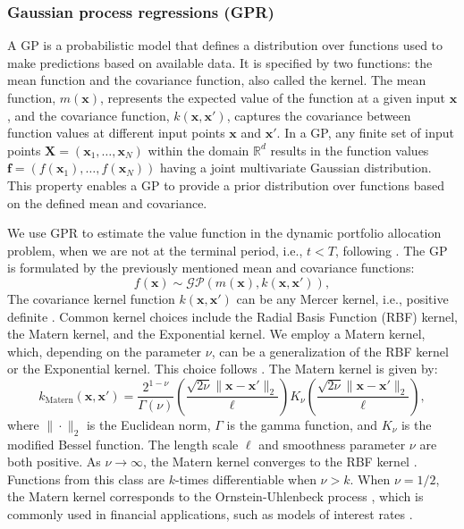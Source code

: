 \documentclass[11pt]{article}
\begin{document}
\subsubsection{Gaussian process regressions (GPR)} \label{Subsubsection: GPR}
A \ac{GP} is a probabilistic model that defines a distribution over functions used to make predictions based on available data. 
It is specified by two functions: the mean function and the covariance function, also called the kernel. 
The mean function, \( m(\mathbf{x}) \), represents the expected value of the function at a given input \( \mathbf{x} \), 
and the covariance function, \( k(\mathbf{x}, \mathbf{x}') \), 
captures the covariance between function values at different input points \( \mathbf{x} \) and \( \mathbf{x}' \).
In a \ac{GP}, any finite set of input points \( \mathbf{X} = (\mathbf{x}_1, \dots, \mathbf{x}_N) \) within the domain \( \mathbb{R}^d \) 
results in the function values \( \mathbf{f} = (f(\mathbf{x}_1), \dots, f(\mathbf{x}_N)) \) having a joint multivariate Gaussian distribution.
This property enables a GP to provide a prior distribution over functions based on the defined mean and covariance.

We use \ac{GPR} to estimate the value function in the dynamic portfolio allocation problem,
when we are not at the terminal period, i.e., \( t < T \), following \textcite{Scheidegger2023}.
The \ac{GP} is formulated by the previously mentioned mean and covariance functions:
\begin{equation} \label{eq: GP-definition}
  f(\mathbf{x}) \sim \mathcal{GP}(m(\mathbf{x}), k(\mathbf{x}, \mathbf{x}')),
\end{equation}
The covariance kernel function \( k(\mathbf{x}, \mathbf{x}') \) can be any Mercer kernel, i.e., positive definite \autocite{MurphyBook2023}.
Common kernel choices include the Radial Basis Function (RBF) kernel, the Matern kernel, and the Exponential kernel.
We employ a Matern kernel, which, depending on the parameter \( \nu \), 
can be a generalization of the RBF kernel or the Exponential kernel. This choice follows \textcite{Scheidegger2023}.
The Matern kernel is given by:
\begin{equation} \label{eq: Matern-kernel}
  k_{\text{Matern}}(\mathbf{x} , \mathbf{x}') = \frac{2^{1-\nu}}{\Gamma(\nu)}  \left( \frac{\sqrt{2 \nu} \| \mathbf{x} - \mathbf{x}' \|_{2}}{\ell} \right) K_{\nu} \left( \frac{\sqrt{2 \nu} \| \mathbf{x} - \mathbf{x}' \|_{2}}{\ell} \right),
\end{equation}
where \( \| \cdot \|_{2} \) is the Euclidean norm, \( \Gamma \) is the gamma function, and \( K_{\nu} \) is the modified Bessel function.
The length scale \( \ell \) and smoothness parameter \( \nu \) are both positive. As \( \nu \to \infty \), the Matern kernel converges to the RBF kernel \autocite{Gonzalvez2019}.
Functions from this class are \( k \)-times differentiable when \( \nu > k \).
When \( \nu = 1/2 \), the Matern kernel corresponds to the Ornstein-Uhlenbeck process \autocite{MurphyBook2023},
which is commonly used in financial applications, such as models of interest rates \autocite{Glasserman2004MC}. 
\end{document}
